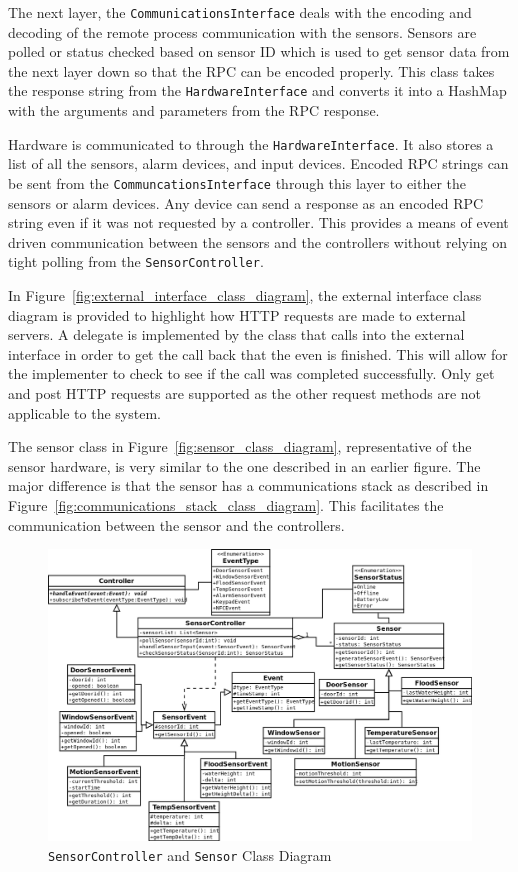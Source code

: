 \documentclass{report}
\begin{document}
The next layer, the \texttt{CommunicationsInterface} deals with the encoding
and decoding of the remote process communication with the sensors. Sensors are
polled or status checked based on sensor ID which is used to get sensor data
from the next layer down so that the RPC can be encoded properly. This class
takes the response string from the \texttt{HardwareInterface} and converts it
into a HashMap with the arguments and parameters from the RPC response.

Hardware is communicated to through the \texttt{HardwareInterface}. It also
stores a list of all the sensors, alarm devices, and input devices. Encoded RPC
strings can be sent from the \texttt{CommuncationsInterface} through this layer
to either the sensors or alarm devices. Any device can send a response as an
encoded RPC string even if it was not requested by a controller. This provides
a means of event driven communication between the sensors and the controllers
without relying on tight polling from the \texttt{SensorController}.

In Figure~\ref{fig:external_interface_class_diagram}, the external interface
class diagram is provided to highlight how HTTP requests are made to external
servers. A delegate is implemented by the class that calls into the external
interface in order to get the call back that the even is finished. This will
allow for the implementer to check to see if the call was completed
successfully. Only get and post HTTP requests are supported as the other request
methods are not applicable to the system.

The sensor class in Figure~\ref{fig:sensor_class_diagram}, representative of
the sensor hardware, is very similar to the one described in an earlier figure.
The major difference is that the sensor has a communications stack as described
in Figure~\ref{fig:communications_stack_class_diagram}. This facilitates the
communication between the sensor and the controllers.
\begin{landscape} 
\begin{figure}[p]
    \caption{\texttt{SensorController} and \texttt{Sensor} Class Diagram}
    \label{fig:sensor_controller_class_diagram}
    \includegraphics[scale=0.5]{sensor_controller_class_diagram.png}
\end{figure}
\end{landscape} 
\end{document}

